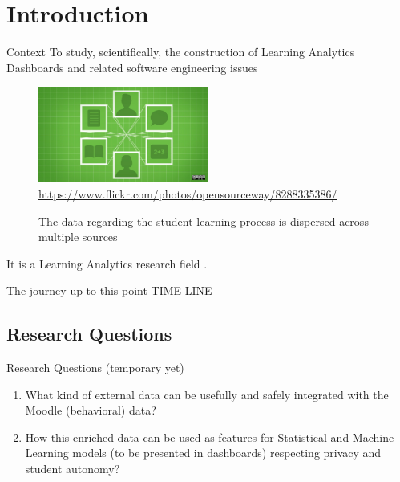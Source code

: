 \section{Introduction}

\begin{frame}{Context}
    To study, scientifically, the construction of Learning Analytics Dashboards and related software engineering issues

    \begin{figure}[H]
        \centering
        \caption{The data regarding the student learning process is dispersed across multiple sources
        \label{fig:digital_learning}}
        \includegraphics[width=0.5\textwidth]{../../images/digital_learning.jpg}
        \\ \small \url{https://www.flickr.com/photos/opensourceway/8288335386/}
    \end{figure}

    It is a Learning Analytics research field \cite{lang2017handbook}.
\end{frame}


\begin{frame}{The journey up to this point}
   TIME LINE
\end{frame}

\subsection{Research Questions}
\begin{frame}{Research Questions (temporary yet)}
    \begin{enumerate}[<+-|alert@+>]\color{gray}
        \item What kind of external data can be usefully and safely integrated with 
              the Moodle (behavioral) data?
        \item How this enriched data can be used as features for Statistical and 
              Machine Learning models (to be presented in dashboards) respecting privacy and student autonomy?
    \end{enumerate}
\end{frame}

